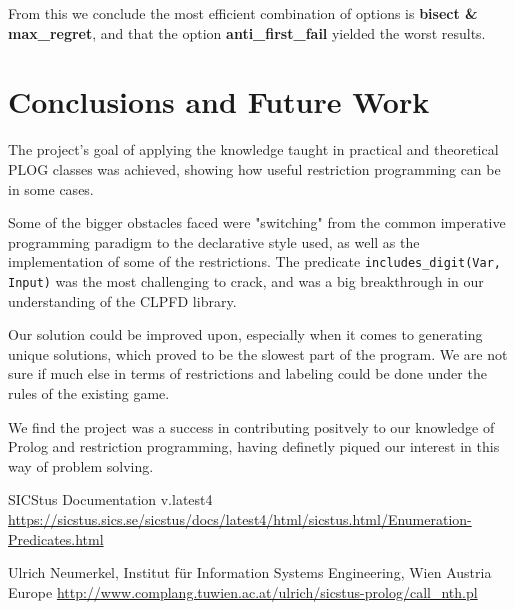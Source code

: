 \documentclass[runningheads]{llncs}
\begin{document}
From this we conclude the most efficient combination of options is \textbf{bisect \& max\_regret}, and that the option \textbf{anti\_first\_fail} yielded the worst results.

\section{Conclusions and Future Work}
The project's goal of applying the knowledge taught in practical and theoretical PLOG classes was achieved, showing how useful restriction programming can be in some cases. 

Some of the bigger obstacles faced were "switching" from the common imperative programming paradigm to the declarative style used, as well as the implementation of some of the restrictions. The predicate \verb!includes_digit(Var, Input)! was the most challenging to crack, and was a big breakthrough in our understanding of the CLPFD library.

Our solution could be improved upon, especially when it comes to generating unique solutions, which proved to be the slowest part of the program. We are not sure if much else in terms of restrictions and labeling could be done under the rules of the existing game.

We find the project was a success in contributing positvely to our knowledge of Prolog and restriction programming, having definetly piqued our interest in this way of problem solving.
\begin{thebibliography}{8}





SICStus Documentation v.latest4 \url{https://sicstus.sics.se/sicstus/docs/latest4/html/sicstus.html/Enumeration-Predicates.html}

Ulrich Neumerkel, Institut für Information Systems Engineering, Wien Austria Europe
\url{http://www.complang.tuwien.ac.at/ulrich/sicstus-prolog/call_nth.pl}

\end{thebibliography}
\end{document}
